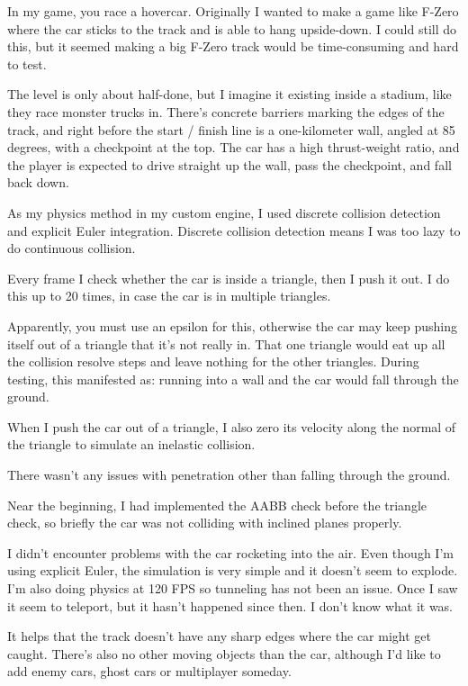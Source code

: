 \documentclass[]{book}
\begin{document}
In my game, you race a hovercar. Originally I wanted to make a game like
F-Zero where the car sticks to the track and is able to hang
upside-down. I could still do this, but it seemed making a big F-Zero
track would be time-consuming and hard to test.

The level is only about half-done, but I imagine it existing inside a
stadium, like they race monster trucks in. There's concrete barriers
marking the edges of the track, and right before the start / finish line
is a one-kilometer wall, angled at 85 degrees, with a checkpoint at the
top. The car has a high thrust-weight ratio, and the player is expected
to drive straight up the wall, pass the checkpoint, and fall back down.

As my physics method in my custom engine, I used discrete collision
detection and explicit Euler integration. Discrete collision detection
means I was too lazy to do continuous collision.

Every frame I check whether the car is inside a triangle, then I push it
out. I do this up to 20 times, in case the car is in multiple triangles.

Apparently, you must use an epsilon for this, otherwise the car may keep
pushing itself out of a triangle that it's not really in. That one
triangle would eat up all the collision resolve steps and leave nothing
for the other triangles. During testing, this manifested as: running
into a wall and the car would fall through the ground.

When I push the car out of a triangle, I also zero its velocity along
the normal of the triangle to simulate an inelastic collision.

There wasn't any issues with penetration other than falling through the
ground.

Near the beginning, I had implemented the AABB check before the triangle
check, so briefly the car was not colliding with inclined planes
properly.

I didn't encounter problems with the car rocketing into the air. Even
though I'm using explicit Euler, the simulation is very simple and it
doesn't seem to explode. I'm also doing physics at 120 FPS so tunneling
has not been an issue. Once I saw it seem to teleport, but it hasn't
happened since then. I don't know what it was.

It helps that the track doesn't have any sharp edges where the car might
get caught. There's also no other moving objects than the car, although
I'd like to add enemy cars, ghost cars or multiplayer someday.
\end{document}

